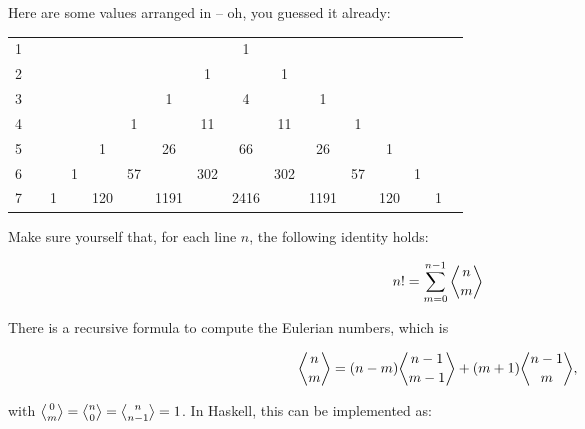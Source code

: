 \documentclass{scrreprt}
\begin{document}
Here are some values arranged in -- 
oh, you guessed it already:

\begin{tabular}{l c c c c c c c c c c c c c c c}
1 &   &   &    &    &    &    &     &  1 &     &    &    &    &    &   &   \\
2 &   &   &    &    &    &    &   1 &    &   1 &    &    &    &    &   &   \\
3 &   &   &    &    &    &  1 &     &  4 &     &  1 &    &    &    &   &   \\
4 &   &   &    &    &  1 &    &  11 &    &  11 &    &  1 &    &    &   &   \\
5 &   &   &    &  1 &    & 26 &     & 66 &     & 26 &    &  1 &    &   &   \\
6 &   &   &  1 &    & 57 &    & 302 &    & 302 &    & 57 &    &  1 &   &   \\   
7 &   & 1 &    &120 &    &1191&     &2416&     &1191&    &120 &    & 1 &   
\end{tabular}

Make sure yourself that, for each line $n$, the following identity holds:

\begin{equation}
n! = \sum_{m=0}^{n-1}{\eulerianOne{n}{m}}
\end{equation}

There is a recursive formula 
to compute the Eulerian numbers, which is

\begin{equation}
\eulerianOne{n}{m} = (n-m) \eulerianOne{n-1}{m-1}
                   + (m+1) \eulerianOne{n-1}{m},
\end{equation}

with $\eulerianOne{0}{m} = \eulerianOne{n}{0} = \eulerianOne{n}{n-1} = 1$.
In Haskell, this can be implemented as:
\end{document}
